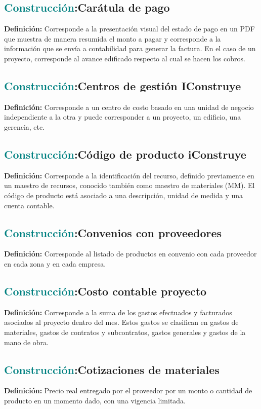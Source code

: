 \documentclass[12pt]{article}
\begin{document}
\subsection{\textcolor{teal}{Construcción}:{Carátula de pago}}
\textbf{Definición:} Corresponde a la presentación visual del estado de pago en un PDF que muestra de manera resumida el monto a pagar y corresponde a la información que se envía a contabilidad para generar la factura. En el caso de un proyecto, corresponde al avance edificado respecto al cual se hacen los cobros.
\subsection{\textcolor{teal}{Construcción}:{Centros de gestión IConstruye}}
\textbf{Definición:} Corresponde a un centro de costo basado en una unidad de negocio independiente a la otra y puede corresponder a un proyecto, un edificio, una gerencia, etc.
\subsection{\textcolor{teal}{Construcción}:{Código de producto iConstruye}}
\textbf{Definición:} Corresponde a la identificación del recurso, definido previamente en un maestro de recursos, conocido también como maestro de materiales (MM). El código de producto está asociado a una descripción, unidad de medida y una cuenta contable.
\subsection{\textcolor{teal}{Construcción}:{Convenios con proveedores}}
\textbf{Definición:} Corresponde al listado de productos en convenio con cada proveedor en cada zona y en cada empresa.
\subsection{\textcolor{teal}{Construcción}:{Costo contable proyecto}}
\textbf{Definición:} Corresponde a la suma de los gastos efectuados y facturados asociados al proyecto dentro del mes. Estos gastos se clasifican en gastos de materiales, gastos de contratos y subcontratos, gastos generales y gastos de la mano de obra.
\subsection{\textcolor{teal}{Construcción}:{Cotizaciones de materiales}}
\textbf{Definición:} Precio real entregado por el proveedor por un monto o cantidad de producto en un momento dado, con una vigencia limitada.
\end{document}
